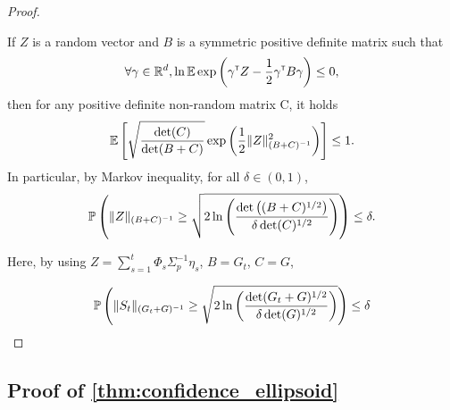 \documentclass{article}
\begin{document}
\begin{proof}





\begin{lemma}
If $Z$ is a random vector and $B$ is a symmetric positive definite matrix such that
\[\forall \gamma\in\mathbb{R}^d, \ln \operatorname*{\mathbb{E}} \exp \left(\gamma^{\mathsf{\scriptscriptstyle T}} Z -\frac{1}{2} \gamma^{\mathsf{\scriptscriptstyle T}} B \gamma \right)\leq 0,\]
then for any positive definite non-random matrix C, it holds
\[\operatorname*{\mathbb{E}}\left[ \sqrt{\frac{\det(C)}{\det(B+C)} } \exp\left( \frac{1}{2}\|Z\|^2_{(B+C)^{-1}}\right)\right]\leq 1. \] 
In particular, by Markov inequality, for all $\delta\in(0,1)$, 
\[\mathbb{P}\left(\|Z\|_{(B+C)^{-1}} \geq \sqrt{2\ln \left(\frac{\det \left((B+C)^{1/2}\right)}{\delta\det(C)^{1/2}}\right)}\right)\leq \delta.\]
\end{lemma}

Here, by using $Z = \sum_{s=1}^t\Phi_s\Sigma_p^{-1}\eta_s$, $B=G_t$, $C=G$,

\[
\mathbb{P}\left(\| S_t \|_{(G_t+G)^{-1}} \geq \sqrt{2\ln \left(\frac{\det(G_t+G)^{1/2}}{\delta\det(G)^{1/2}}\right)}\right) \leq \delta
\]

\end{proof}

\subsection{Proof of \autoref{thm:confidence_ellipsoid}}
\end{document}
